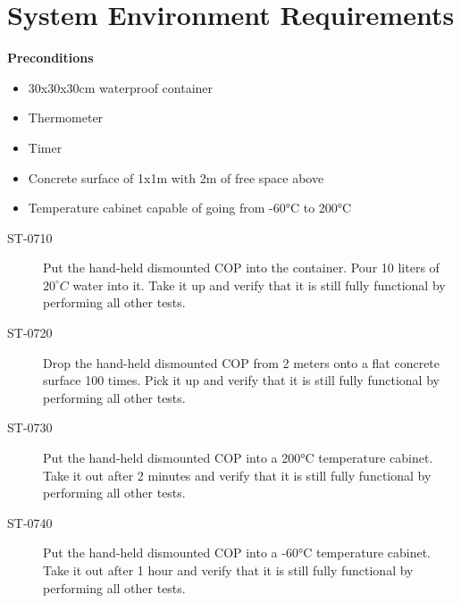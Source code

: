 \section{System Environment Requirements}

\textbf{Preconditions}
\begin{itemize}
\item 30x30x30cm waterproof container
\item Thermometer
\item Timer
\item Concrete surface of 1x1m with 2m of free space above
\item Temperature cabinet capable of going from -60°C to 200°C
\end{itemize}

\begin{description}
\item[ST-0710] Put the hand-held dismounted COP into the container. Pour 10 liters of $20^{\circ}C$ water into it. Take it up and verify that it is still fully functional by performing all other tests. 
\item[ST-0720]Drop the hand-held dismounted COP from 2 meters onto a flat concrete surface 100 times. Pick it up and verify that it is still fully functional by performing all other tests. 
\item[ST-0730] Put the hand-held dismounted COP into a 200°C temperature cabinet. Take it out after 2 minutes and verify that it is still fully functional by performing all other tests. 
\item[ST-0740] Put the hand-held dismounted COP into a -60°C temperature cabinet. Take it out after 1 hour and verify that it is still fully functional by performing all other tests. 
\end{description}
